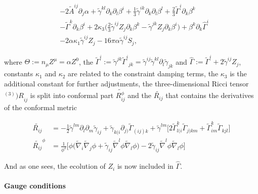 {\begin{align}
    & - 2\widetilde{A}^{ij}\partial_{j}\alpha + \widetilde{\gamma}^{kl}\partial_{k}\partial_{l}\beta^{i} + \frac{1}{3} \widetilde{\gamma}^{ik}\partial_{k}\partial_{l}\beta^{l} + \frac{2}{3}\widetilde{\Gamma}^i\partial_{k}\beta^{k} \\
    & - \widetilde{\Gamma}^k\partial_{k}\beta^{i} + 2\kappa_3\Big(\frac{2}{3}\widetilde{\gamma}^{ij}Z_{j}\partial_{k}\beta^{k} - \widetilde{\gamma}^{jk}Z_{j}\partial_{k}\beta^{i}\Big) + \beta^{k}\partial_{k}\hat{\Gamma}^i \\
    & -2\alpha\kappa_1\widetilde{\gamma}^{ij}Z_{j}- 16\pi\alpha\widetilde{\gamma}^{ij}S_j,
    \label{eq:theory:ccz4equations} %
    \end{align}
    
    where $\Theta:=n_{\mu}Z^{\mu}=\alpha Z^0$, the $\widetilde{\Gamma}^i:=\widetilde{\gamma}^{jk}{\widetilde{\Gamma}^i}_{jk} = \widetilde{\gamma}^{ij}\widetilde{\gamma}^{kl}\partial_{l}\widetilde{\gamma}_{jk}$ and $\hat{\Gamma}:=\widetilde{\Gamma}^i + 2\widetilde{\gamma}^{ij}Z_j$, constants $\kappa_1$ and $\kappa_2$ are related to the constraint damping terms, the $\kappa_3$ is the additional constant for further adjustments, the three-dimensional Ricci tensor ${^{(3)})R}_{ij}$ is split into conformal part $\widetilde{R_{ij}^{\phi}}$ and the $\widetilde{R_{ij}}$ that contains the derivatives of the conformal metric
    
    \begin{align}
    \widetilde{R_{ij}} &= -\frac{1}{2}\widetilde{\gamma}^{lm}\partial_{l}\partial_{m}\widetilde{\gamma}_{ij} + \widetilde{\gamma}_{k(i}\partial_{j)}\widetilde{\Gamma}_{(ij)k} + \widetilde{\gamma}^{lm}\big[2\widetilde{\Gamma}^{k}_{l(i}\widetilde{\Gamma}_{j)km} + \widetilde{\Gamma}^{k}_{im}\widetilde{\Gamma}_{kjl}\big] \\
    \widetilde{R_{ij}}^{\phi} &= \frac{1}{\phi^2}\big[\phi\big(\widetilde{\nabla}_{i}\widetilde{\nabla}_{j}\phi + \widetilde{\gamma}_{ij}\widetilde{\nabla}^{l}\phi\widetilde{\nabla}_{l}\phi\big) - 2\widetilde{\gamma}_{ij}\widetilde{\nabla}^{l}\phi\widetilde{\nabla}_{l}\phi\big]
    \end{align}
    
    And as one sees, the ecolution of $Z_i$ is now included in $\hat{\Gamma}$. 
    
    
    \paragraph{Gauge conditions}
    
}
